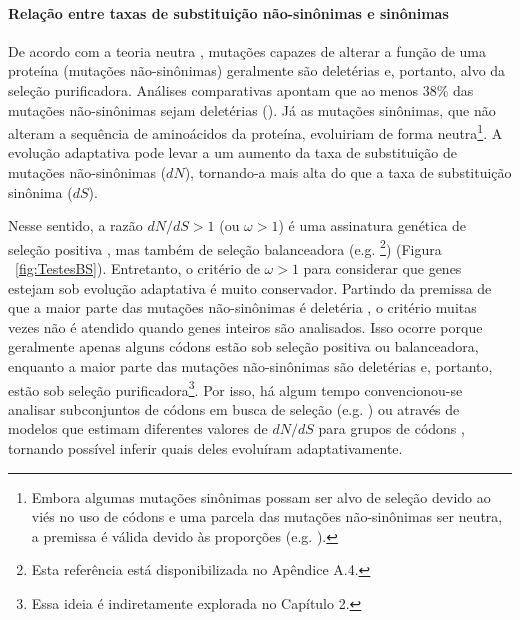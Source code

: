\begin{refsection}
\paragraph{Relação entre taxas de substituição não-sinônimas e sinônimas}%
De acordo com a teoria neutra \parencite{Kimura1968,Kimura1983}, mutações capazes de alterar a função de uma proteína (mutações não-sinônimas) geralmente são deletérias e, portanto, alvo da seleção purificadora. Análises comparativas apontam que ao menos 38\% das mutações não-sinônimas sejam deletérias (\cite{Eyre-Walker1999}). Já as mutações sinônimas, que não alteram a sequência de aminoácidos da proteína, evoluiriam de forma neutra\footnote{Embora algumas mutações sinônimas possam ser alvo de seleção devido ao viés no uso de códons e uma parcela das mutações não-sinônimas ser neutra, a premissa é válida devido às proporções (e.g. \cite{Comeron2008}).}. A evolução adaptativa pode levar a um aumento da taxa de substituição de mutações não-sinônimas ($dN$), tornando-a mais alta do que a taxa de substituição sinônima ($dS$).
%

	Nesse sentido, a razão $dN/dS>1$ (ou $\omega>1$) é uma assinatura genética de seleção positiva \parencite{Gillespie1991,Nielsen2005}, mas também de seleção balanceadora (e.g. \cite{Bitarello2015}\footnote{Esta referência está disponibilizada no Apêndice A.4.}) (Figura ~\ref{fig:TestesBS}). Entretanto, o critério de $\omega > 1$ para considerar que genes estejam sob evolução adaptativa é muito conservador. Partindo da premissa de que a maior parte das mutações não-sinônimas é deletéria \parencite{Kimura1963,Kimura1968,Eyre-Walker1999}, o critério muitas vezes não é atendido quando genes inteiros são analisados. Isso ocorre porque geralmente apenas alguns códons estão sob seleção positiva ou balanceadora, enquanto a maior parte das mutações não-sinônimas são deletérias e, portanto, estão sob seleção purificadora\footnote{Essa ideia é indiretamente explorada no Capítulo 2.}. Por isso, há algum tempo convencionou-se analisar subconjuntos de códons em busca de seleção (e.g. \cite{Hughes1988,Hughes1989a,Bitarello2015}) ou através de modelos que estimam diferentes valores de $dN/dS$ para grupos de códons \parencite{Yang2002a, Bitarello2015}, tornando possível inferir quais deles evoluíram adaptativamente.

\end{refsection}
